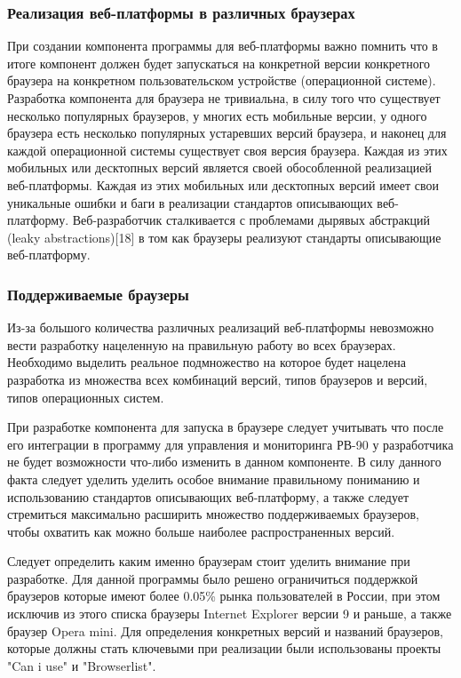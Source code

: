 \subsubsection{ Реализация веб-платформы в различных браузерах}
При создании компонента программы для веб-платформы важно помнить что в итоге компонент должен будет запускаться на конкретной версии конкретного браузера на конкретном пользовательском устройстве (операционной системе).
Разработка компонента для браузера не тривиальна, в силу того что существует несколько популярных браузеров, у многих есть мобильные версии, у одного браузера есть несколько популярных устаревших версий браузера, и наконец для каждой операционной системы существует своя версия браузера. Каждая из этих мобильных или десктопных версий является своей обособленной реализацией веб-платформы. Каждая из этих мобильных или десктопных версий имеет свои уникальные ошибки и баги в реализации стандартов описывающих веб-платформу. Веб-разработчик сталкивается с проблемами дырявых абстракций (leaky abstractions)[18] в том как браузеры реализуют стандарты описывающие веб-платформу.


\subsubsection{ Поддерживаемые браузеры}
Из-за большого количества различных реализаций веб-платформы невозможно вести разработку нацеленную на правильную работу во всех браузерах. Необходимо выделить реальное подмножество на которое будет нацелена разработка из множества всех комбинаций версий, типов браузеров и версий, типов операционных систем.

При разработке компонента для запуска в браузере следует учитывать что после его интеграции в программу для управления и мониторинга РВ-90 у разработчика не будет возможности что-либо изменить в данном компоненте. В силу данного факта следует уделить уделить особое внимание правильному пониманию и использованию стандартов описывающих веб-платформу, а также следует стремиться максимально расширить множество поддерживаемых браузеров, чтобы охватить как можно больше наиболее распространенных версий.

Следует определить каким именно браузерам стоит уделить внимание при разработке. 
Для данной программы было решено ограничиться поддержкой браузеров которые имеют более 0.05\% рынка пользователей в России, при этом исключив из этого списка браузеры Internet Explorer версии 9 и раньше, а также браузер Opera mini. Для определения конкретных версий и названий браузеров, которые должны стать ключевыми при реализации были использованы проекты "Can i use" и "Browserlist".

